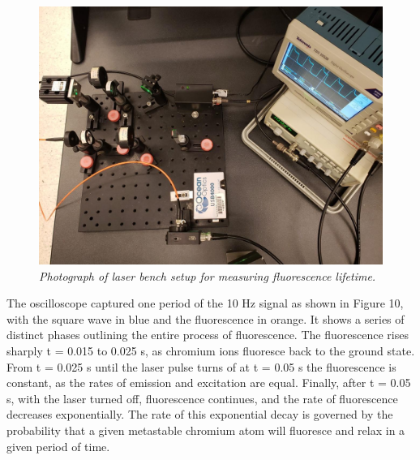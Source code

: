 \documentclass[11pt, a4paper, twocolumn]{article}
\begin{document}
\begin{figure}[]
\includegraphics[width=\linewidth, height=\linewidth]{laserBenchPhoto.png}
\caption{\textit{Photograph of laser bench setup for measuring fluorescence lifetime.
}}
\label{fig:laserBenchPhoto}
\end{figure}

The oscilloscope captured one period of the 10 Hz signal as shown in Figure 10, with the square  wave  in  blue  and  the  fluorescence  in  orange. 
It shows a series of distinct phases outlining the entire process of fluorescence. The fluorescence rises sharply t = 0.015 to 0.025 s, as chromium ions fluoresce back to the ground state. From t = 0.025 s until the laser pulse turns of at t = 0.05 s the fluorescence is constant, as the rates of emission and excitation are equal. Finally, after t = 0.05 s, with the laser turned off, fluorescence continues, and the rate of fluorescence decreases exponentially. The rate of this exponential decay is governed by the probability that a given metastable chromium atom will fluoresce and relax in a given period of time. 
\end{document}
